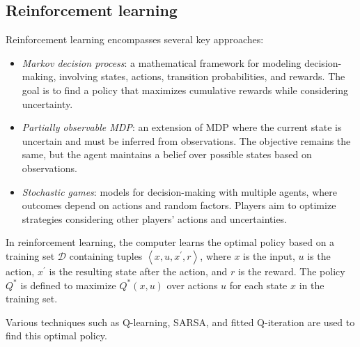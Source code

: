 \subsection{Reinforcement learning}
Reinforcement learning encompasses several key approaches:
\begin{itemize}
    \item \textit{Markov decision process}: a mathematical framework for modeling decision-making, involving states, actions, transition probabilities, and rewards. 
        The goal is to find a policy that maximizes cumulative rewards while considering uncertainty.
    \item \textit{Partially observable MDP}: an extension of MDP where the current state is uncertain and must be inferred from observations. 
        The objective remains the same, but the agent maintains a belief over possible states based on observations.
    \item \textit{Stochastic games}: models for decision-making with multiple agents, where outcomes depend on actions and random factors. 
        Players aim to optimize strategies considering other players' actions and uncertainties.
\end{itemize}
In reinforcement learning, the computer learns the optimal policy based on a training set $\mathcal{D}$ containing tuples $\left\langle x,u,x^\prime,r \right\rangle$, where $x$ is the input, $u$ is the action, $x^\prime$ is the resulting state after the action, and $r$ is the reward.
The policy $Q^\ast$ is defined to maximize $Q^\ast(x,u)$ over actions $u$ for each state $x$ in the training set. 

Various techniques such as Q-learning, SARSA, and fitted Q-iteration are used to find this optimal policy.